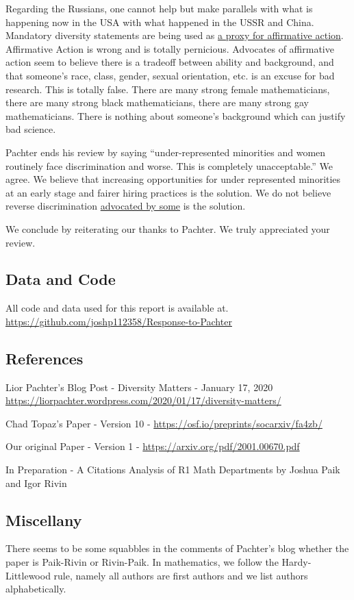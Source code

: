 \documentclass[]{article}
\begin{document}
Regarding the Russians, one cannot help but make parallels with what is
happening now in the USA with what happened in the USSR and China.
Mandatory diversity statements are being used as
\href{https://whyevolutionistrue.wordpress.com/2019/12/31/life-science-jobs-at-berkeley-with-hiring-giving-precedence-to-diversity-and-inclusion-statements/?fbclid=IwAR1tnpRsEfr43Y4b47EtScpSH_sUdhuqcfjBmi0Ez0uhxrK-aW4lR4C9sfg}{a
proxy for affirmative action}. Affirmative Action is wrong and is
totally pernicious. Advocates of affirmative action seem to believe
there is a tradeoff between ability and background, and that someone's
race, class, gender, sexual orientation, etc. is an excuse for bad
research. This is totally false. There are many strong female
mathematicians, there are many strong black mathematicians, there are
many strong gay mathematicians. There is nothing about someone's
background which can justify bad science.

Pachter ends his review by saying ``under-represented minorities and
women routinely face discrimination and worse. This is completely
unacceptable.'' We agree. We believe that increasing opportunities for
under represented minorities at an early stage and fairer hiring
practices is the solution. We do not believe reverse discrimination
\href{https://blogs.ams.org/inclusionexclusion/2017/05/11/get-out-the-way/}{advocated
by some} is the solution.

We conclude by reiterating our thanks to Pachter. We truly appreciated
your review.

\hypertarget{data-and-code}{%
\subsection{Data and Code}\label{data-and-code}}

All code and data used for this report is available at.
\url{https://github.com/joshp112358/Response-to-Pachter}

\hypertarget{references}{%
\subsection{References}\label{references}}

Lior Pachter's Blog Post - Diversity Matters - January 17, 2020
\url{https://liorpachter.wordpress.com/2020/01/17/diversity-matters/}

Chad Topaz's Paper - Version 10 -
\url{https://osf.io/preprints/socarxiv/fa4zb/}

Our original Paper - Version 1 -
\url{https://arxiv.org/pdf/2001.00670.pdf}

In Preparation - A Citations Analysis of R1 Math Departments by Joshua
Paik and Igor Rivin

\hypertarget{miscellany}{%
\subsection{Miscellany}\label{miscellany}}

There seems to be some squabbles in the comments of Pachter's blog
whether the paper is Paik-Rivin or Rivin-Paik. In mathematics, we follow
the Hardy-Littlewood rule, namely all authors are first authors and we
list authors alphabetically.
\end{document}

